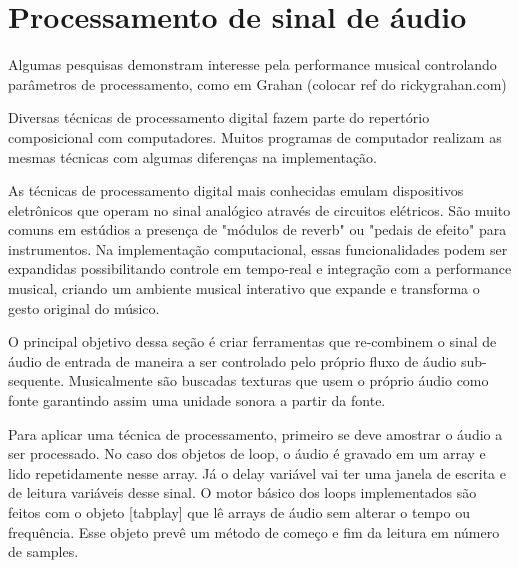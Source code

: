 \documentclass[draft]{ppgmus}
\begin{document}
\pagebreak

\section{Processamento de sinal de áudio}


Algumas pesquisas demonstram interesse pela 
performance musical controlando parâmetros de processamento, como
em Grahan (colocar ref do rickygrahan.com)




Diversas técnicas de processamento digital fazem parte do repertório
composicional com computadores. Muitos programas de computador realizam
as mesmas técnicas com algumas diferenças na implementação.

As técnicas de processamento digital mais conhecidas emulam dispositivos
eletrônicos que operam no sinal analógico através de circuitos elétricos.
São muito comuns em estúdios a presença de "módulos de reverb" ou 
"pedais de efeito" para instrumentos. Na implementação computacional,
essas funcionalidades podem ser expandidas possibilitando controle em
tempo-real e integração com a performance musical, criando um ambiente
musical interativo que expande e transforma o gesto original do músico.

O principal objetivo dessa seção é criar ferramentas que re-combinem
o sinal de áudio de entrada de maneira a ser controlado pelo próprio
fluxo de áudio sub-sequente. Musicalmente são buscadas texturas que usem
o próprio áudio como fonte garantindo assim uma unidade sonora a partir da fonte.

Para aplicar uma técnica de processamento, primeiro se deve amostrar
o áudio a ser processado. No caso dos objetos de loop, o áudio é gravado
em um array e lido repetidamente nesse array. Já o delay variável vai ter uma
janela de escrita e de leitura variáveis desse sinal. O motor básico dos loops 
implementados são feitos com o objeto [tabplay\texttildelow] que lê arrays
de áudio sem alterar o tempo ou frequência. Esse objeto prevê um método de começo e fim
da leitura em número de samples.
\end{document}
